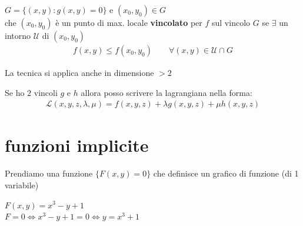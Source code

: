 \documentclass[a4paper, oneside]{article}
\begin{document}
        \begin{definition}
             $G=\{(x,y) : g(x,y) = 0\}$ e  $(x_0,y_0) \in G$\\
             che $(x_0,y_0)$ è un punto di max. locale \textbf{vincolato} per $f$ sul vincolo $G$ se $\exists$ un intorno $\mathcal{U}$ di $(x_0,y_0)$ 
            \begin{gather*}
                f(x,y) \leq f(x_0,y_0) \qquad \forall (x,y) \in \mathcal{U} \cap  G
            \end{gather*} 
            \begin{center}
            \end{center}
        \end{definition}


        \begin{aside}
            La tecnica si applica anche in dimensione $> 2$
        \end{aside}


        \begin{aside}
            Se ho $2$ vincoli $g$ e $h$ allora posso scrivere la lagrangiana nella forma:
            \begin{gather*}
                \mathcal{L}(x,y,z, \lambda, \mu) = f(x,y,z) + \lambda g(x,y,z) + \mu h(x,y,z)
            \end{gather*}
        \end{aside}





        \section{funzioni implicite}
        Prendiamo una funzione $\{F(x,y) = 0\}$ che definisce un grafico di funzione (di 1 variabile)\\
        \begin{example}
            $F(x,y) = x^3-y+1$\\
            $F=0 \Leftrightarrow x^3-y+1 = 0 \Leftrightarrow y = x^3+1$
        \end{example}
\end{document}
